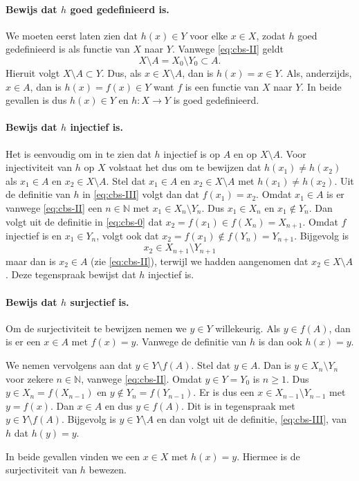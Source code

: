 \begin{bewijs}{}{}
    \paragraph{Bewijs dat $h$ goed gedefinieerd is.}
    We moeten eerst laten zien dat $h(x) \in Y$ voor elke $x \in X$, zodat $h$ goed gedefinieerd is als functie van $X$ naar $Y$.
    Vanwege \cref{eq:cbs-II} geldt
    \[
        X \setminus A = X_0 \setminus Y_0 \subset A.
    \]
    Hieruit volgt $X \setminus A \subset Y$.
    Dus, als $x \in X \setminus A$, dan is $h(x) = x \in Y$.
    Als, anderzijds, $x \in A$, dan is $h(x) = f(x) \in Y$ want $f$ is een functie van $X$ naar $Y$.
    In beide gevallen is dus $h(x) \in Y$ en $h: X \to Y$ is goed gedefinieerd.

    \paragraph{Bewijs dat $h$ injectief is.}
    Het is eenvoudig om in te zien dat $h$ injectief is op $A$ en op $X \setminus A$.
    Voor injectiviteit van $h$ op $X$ volstaat het dus om te bewijzen dat $h(x_1) \neq h(x_2)$ als $x_1 \in A$ en $x_2 \in X \setminus A$.
    Stel dat $x_1 \in A$ en $x_2 \in X \setminus A$ met $h(x_1) \neq h(x_2)$.
    Uit de definitie van $h$ in \cref{eq:cbs-III} volgt dan dat $f(x_1) = x_2$.
    Omdat $x_1 \in A$ is er vanwege \cref{eq:cbs-II} een $n \in \mathbb{N}$ met $x_1 \in X_n \setminus Y_n$.
    Dus $x_1 \in X_n$ en $x_1 \notin Y_n$.
    Dan volgt uit de definitie in \cref{eq:cbs-0} dat $x_2 = f(x_1) \in f(X_n) = X_{n+1}$.
    Omdat $f$ injectief is en $x_1 \in Y_n$, volgt ook dat $x_2 = f(x_1) \notin f(Y_n) = Y_{n+1}$.
    Bijgevolg is
    \[
        x_2 \in X_{n+1} \setminus Y_{n+1}
    \] maar dan is $x_2 \in A$ (zie \cref{eq:cbs-II}), terwijl we hadden aangenomen dat $x_2 \in X \setminus A$.
    Deze tegenspraak bewijst dat $h$ injectief is.
    \paragraph{Bewijs dat $h$ surjectief is.}
    Om de surjectiviteit te bewijzen nemen we $y \in Y$ willekeurig.
    Als $y \in f(A)$, dan is er een $x \in A$ met $f(x) = y$.
    Vanwege de definitie van $h$ is dan ook $h(x) = y$.

    We nemen vervolgens aan dat $y \in Y \setminus f(A)$.
    Stel dat $y \in A$.
    Dan is $y \in X_n \setminus Y_n$ voor zekere $n \in \mathbb{N}$, vanwege \cref{eq:cbs-II}.
    Omdat $y \in Y = Y_0$ is $n \geq 1$.
    Dus $y \in X_n = f(X_{n-1})$ en $y \notin Y_n = f(Y_{n-1})$.
    Er is dus een $x \in X_{n-1} \setminus Y_{n-1}$ met $y = f(x)$.
    Dan $x \in A$ en dus $y \in f(A)$.
    Dit is in tegenspraak met $y \in Y \setminus f(A)$.
    Bijgevolg is $y \in Y \setminus A$ en dan volgt uit de definitie, \cref{eq:cbs-III}, van $h$ dat $h(y) = y$.

    In beide gevallen vinden we een $x \in X$ met $h(x) = y$.
    Hiermee is de surjectiviteit van $h$ bewezen.
\end{bewijs}


